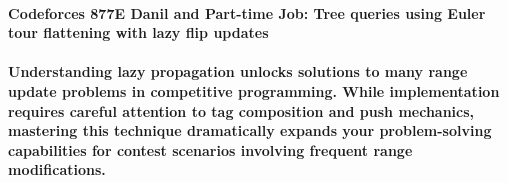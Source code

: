\paragraph{Codeforces 877E Danil and Part-time Job: Tree queries using Euler tour flattening with lazy flip updates}

\paragraph{Understanding lazy propagation unlocks solutions to many range update problems in competitive programming.
While implementation requires careful attention to tag composition and push mechanics, mastering this technique dramatically expands your problem-solving capabilities for contest scenarios involving frequent range modifications.}
